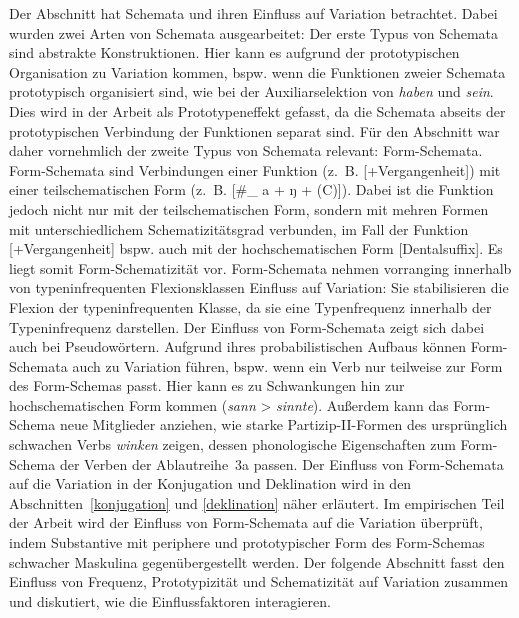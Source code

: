 Der Abschnitt hat Schemata und ihren Einfluss auf Variation betrachtet. Dabei wurden zwei Arten von Schemata ausgearbeitet: Der erste Typus von Schemata sind abstrakte Konstruktionen. Hier kann es aufgrund der prototypischen Organisation zu Variation kommen, bspw. wenn die Funktionen zweier Schemata prototypisch organisiert sind, wie bei der Auxiliarselektion von \textit{haben} und \textit{sein}. Dies wird in der Arbeit als Prototypeneffekt gefasst, da die Schemata abseits der prototypischen Verbindung der Funktionen separat sind. Für den Abschnitt war daher vornehmlich der zweite Typus von Schemata relevant: Form-Schemata. Form-Schemata sind Verbindungen einer Funktion (z.~B. [+Vergangenheit]) mit einer teilschematischen Form (z.~B. [\#\_ a + ŋ + (C)]). Dabei ist die Funktion jedoch nicht nur mit der teilschematischen Form, sondern mit mehren Formen mit unterschiedlichem Schematizitätsgrad verbunden, im Fall der Funktion [+Vergangenheit] bspw. auch mit der hochschematischen Form [Dentalsuffix]. Es liegt somit Form-Schematizität vor. Form-Schemata nehmen vorranging innerhalb von typeninfrequenten Flexionsklassen Einfluss auf Variation: Sie stabilisieren die Flexion der typeninfrequenten Klasse, da sie eine Typenfrequenz innerhalb der Typeninfrequenz darstellen. Der Einfluss von Form-Schemata zeigt sich dabei auch bei Pseudowörtern. Aufgrund ihres probabilistischen Aufbaus können Form-Schemata auch zu Variation führen, bspw. wenn ein Verb nur teilweise zur Form des Form-Schemas passt. Hier kann es zu Schwankungen hin zur hochschematischen Form kommen (\textit{sann} > \textit{sinnte}).  Außerdem kann das Form-Schema neue Mitglieder anziehen, wie starke Partizip-II-Formen des ursprünglich schwachen Verbs \textit{winken} zeigen, dessen phonologische Eigenschaften zum Form-Schema der Verben der Ablautreihe~3a passen. Der Einfluss von Form-Schemata auf die Variation in der Konjugation und Deklination wird in den Abschnitten~\ref{konjugation} und \ref{deklination} näher erläutert. Im empirischen Teil der Arbeit wird der Einfluss von Form-Schemata auf die Variation überprüft, indem Substantive mit periphere und prototypischer Form des Form-Schemas schwacher Maskulina gegenübergestellt werden. Der folgende Abschnitt fasst den Einfluss von Frequenz, Prototypizität und Schematizität auf Variation zusammen und diskutiert, wie die Einflussfaktoren interagieren.


